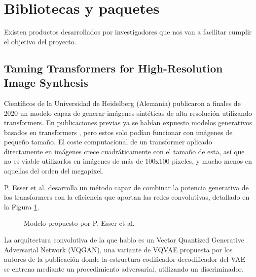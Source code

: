 \newpage
\section{Bibliotecas y paquetes}
Existen productos desarrollados por investigadores que nos van a facilitar cumplir el objetivo del proyecto. 

\subsection{Taming Transformers for High-Resolution Image Synthesis} \label{taming-transformers}
Científicos de la Universidad de Heidelberg (Alemania) publicaron a finales de 2020 un modelo capaz de generar imágenes sintéticas de alta resolución utilizando transformers. En publicaciones previas ya se habían expuesto modelos generativos basados en transformers \cite{chen2020generative}, pero estos solo podían funcionar con imágenes de pequeño tamaño. El coste computacional de un transformer aplicado directamente en imágenes crece cuadráticamente con el tamaño de esta, así que no es viable utilizarlos en imágenes de más de 100x100 píxeles, y mucho menos en aquellas del orden del megapixel.

P. Esser et al. \cite{esser2021taming} desarrolla un método capaz de combinar la potencia generativa de los transformers con la eficiencia que aportan las redes convolutivas, detallado en la Figura \ref{fig:taming-transformers}. 

\begin{figure}[H]
\centering
    \caption{Modelo propuesto por P. Esser et al. \cite{esser2021taming}}
    \label{fig:taming-transformers}
\end{figure}

La arquitectura convolutiva de la que hablo es un Vector Quantized Generative Adversarial Network (VQGAN), una variante de VQVAE propuesta por los autores de la publicación donde la estructura codificador-decodificador del VAE se entrena mediante un procedimiento adversarial, utilizando un discriminador.


